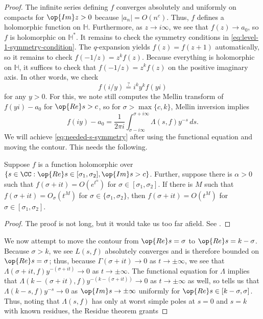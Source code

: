 \documentclass{amsart}
\begin{document}
\begin{proof}
	The infinite series defining $f$ converges absolutely and uniformly on compacts for $\op{Im}z>0$ because $\left|a_n\right|=O\left(n^c\right)$. Thus, $f$ defines a holomorphic function on $\mathbb H$. Furthermore, as $z\to i\infty$, we see that $f(z)\to a_0$, so $f$ is holomorphic on $\mathbb H^*$. It remains to check the symmetry conditions in \eqref{eq:level-1-symmetry-condition}. The $q$-expansion yields $f(z)=f(z+1)$ automatically, so it remains to check $f(-1/z)=z^kf(z)$. Because everything is holomorphic on $\mathbb H$, it suffices to check that $f(-1/z)=z^kf(z)$ on the positive imaginary axis. In other words, we check
	\begin{equation}
		f(i/y)\stackrel?=i^ky^kf(yi) \label{eq:needed-s-symmetry}
	\end{equation}
	for any $y>0$. For this, we note  still computes the Mellin transform of $f(yi)-a_0$ for $\op{Re}s>c$, so for $\sigma>\max\{c,k\}$, Mellin inversion implies
	\[f(iy)-a_0=\frac1{2\pi i}\int_{\sigma-i\infty}^{\sigma+i\infty}\Lambda(s,f)y^{-s}\,ds.\]
	We will achieve \eqref{eq:needed-s-symmetry} after using the functional equation and moving the contour. This needs the following.
	\begin{proposition} \label{prop:pl}
		Suppose $f$ is a function holomorphic over $\{s\in\CC:\op{Re}s\in[\sigma_1,\sigma_2],\op{Im}s>c\}$. Further, suppose there is $\alpha>0$ such that $f(\sigma+it)=O\left(e^{t^\alpha}\right)$ for $\sigma\in[\sigma_1,\sigma_2]$. If there is $M$ such that $f(\sigma+it)=O_\sigma\left(t^M\right)$ for $\sigma\in\{\sigma_1,\sigma_2\}$, then $f(\sigma+it)=O\left(t^M\right)$ for $\sigma\in[\sigma_1,\sigma_2]$.
	\end{proposition}
	\begin{proof}
		The proof is not long, but it would take us too far afield. See \cite[p.~262]{lang-alg-nt}.
	\end{proof}
	We now attempt to move the contour from $\op{Re}s=\sigma$ to $\op{Re}s=k-\sigma$. Because $\sigma>k$, we see $L(s,f)$ absolutely converges and is therefore bounded on $\op{Re}s=\sigma$; thus, because $\Gamma(\sigma+it)\to0$ as $t\to\pm\infty$, we see that $\Lambda(\sigma+it,f)y^{-(\sigma+it)}\to0$ as $t\to\pm\infty$. The functional equation for $\Lambda$ implies that $\Lambda(k-(\sigma+it),f)y^{-(k-(\sigma+it))}\to0$ as $t\to\pm\infty$ as well, so  tells us that $\Lambda(k-s,f)y^{-s}\to0$ as $\op{Im}s\to\pm\infty$ uniformly for $\op{Re}s\in[k-\sigma,\sigma]$. Thus, noting that $\Lambda(s,f)$ has only at worst simple poles at $s=0$ and $s=k$ with known residues, the Residue theorem grants

\end{proof}
\end{document}
